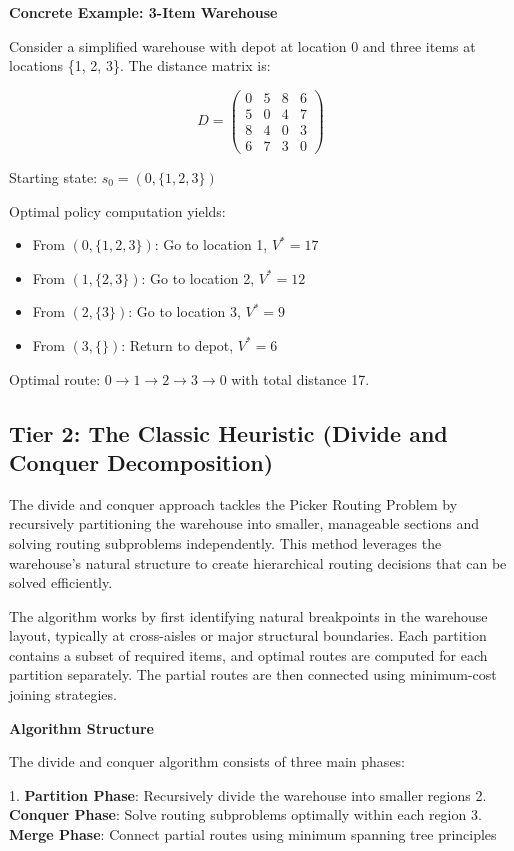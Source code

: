 \documentclass{article}
\begin{document}
\textbf{Concrete Example: 3-Item Warehouse}

Consider a simplified warehouse with depot at location 0 and three items at locations \{1, 2, 3\}. The distance matrix is:

\[
D = \begin{pmatrix}
0 & 5 & 8 & 6 \\
5 & 0 & 4 & 7 \\
8 & 4 & 0 & 3 \\
6 & 7 & 3 & 0
\end{pmatrix}
\]

Starting state: \( s_0 = (0, \{1, 2, 3\}) \)

Optimal policy computation yields:
\begin{itemize}
\item From \( (0, \{1, 2, 3\}) \): Go to location 1, \( V^* = 17 \)
\item From \( (1, \{2, 3\}) \): Go to location 2, \( V^* = 12 \)
\item From \( (2, \{3\}) \): Go to location 3, \( V^* = 9 \)
\item From \( (3, \{\}) \): Return to depot, \( V^* = 6 \)
\end{itemize}

Optimal route: \( 0 \to 1 \to 2 \to 3 \to 0 \) with total distance 17.

\subsection{Tier 2: The Classic Heuristic (Divide and Conquer Decomposition)}

The divide and conquer approach tackles the Picker Routing Problem by recursively partitioning the warehouse into smaller, manageable sections and solving routing subproblems independently. This method leverages the warehouse's natural structure to create hierarchical routing decisions that can be solved efficiently.

The algorithm works by first identifying natural breakpoints in the warehouse layout, typically at cross-aisles or major structural boundaries. Each partition contains a subset of required items, and optimal routes are computed for each partition separately. The partial routes are then connected using minimum-cost joining strategies.

\textbf{Algorithm Structure}

The divide and conquer algorithm consists of three main phases:

1. \textbf{Partition Phase}: Recursively divide the warehouse into smaller regions
2. \textbf{Conquer Phase}: Solve routing subproblems optimally within each region
3. \textbf{Merge Phase}: Connect partial routes using minimum spanning tree principles
\end{document}

